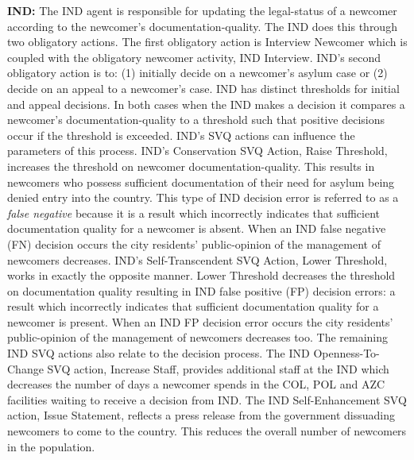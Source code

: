 \documentclass{scspaperproc}
\theoremstyle{scsthe}
\begin{document}
{\bf IND:} The IND agent is responsible for updating the legal-status of a newcomer according to the newcomer's documentation-quality. The IND does this through two obligatory actions. The first obligatory action is Interview Newcomer which is coupled with the obligatory newcomer activity, IND Interview. IND's second obligatory action is to: (1) initially decide on a newcomer's asylum case or (2) decide on an appeal to a newcomer's case. IND has distinct thresholds for initial and appeal decisions. In both cases when the IND makes a decision it compares a newcomer's documentation-quality to a threshold such that positive decisions occur if the threshold is exceeded. IND's SVQ actions can influence the parameters of this process. IND's Conservation SVQ Action, Raise Threshold, increases the threshold on newcomer documentation-quality. This results in newcomers who possess sufficient documentation of their need for asylum being denied entry into the country. This type of IND decision error is referred to as a \emph{false negative} because it is a result which incorrectly indicates that sufficient documentation quality for a newcomer is absent. When an IND false negative (FN) decision occurs the city residents' public-opinion of the management of newcomers decreases. IND's Self-Transcendent SVQ Action, Lower Threshold, works in exactly the opposite manner. Lower Threshold decreases the threshold on documentation quality resulting in IND false positive (FP) decision errors: a result which incorrectly indicates that sufficient documentation quality for a newcomer is present. When an IND FP decision error occurs the city residents' public-opinion of the management of newcomers decreases too. The remaining IND SVQ actions also relate to the decision process. The IND Openness-To-Change SVQ action, Increase Staff, provides additional staff at the IND which decreases the number of days a newcomer spends in the COL, POL and AZC facilities waiting to receive a decision from IND. The IND Self-Enhancement SVQ action, Issue Statement, reflects a press release from the government dissuading newcomers to come to the country. This reduces the overall number of newcomers in the population.
\end{document}

